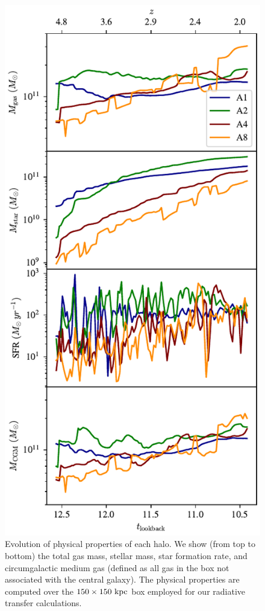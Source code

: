 \begin{figure}
   \centering
   \includegraphics[width=\textwidth,height=0.85\textheight,keepaspectratio]{figures/properties_redshift.pdf}
   \caption{Evolution of physical properties of each halo.
   We show (from top to bottom) the total gas mass, stellar mass, star formation rate, and circumgalactic medium gas (defined as all gas in the box not associated with the central galaxy).
   The physical properties are computed over the $150 \times 150\ \rm kpc$ box employed for our radiative transfer calculations.}
   \label{fig:properties_redshift}
\end{figure}

